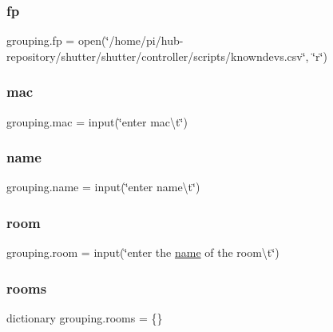 \mbox{\label{namespacegrouping_a1160ca96fae06497787f492dd59fd401}} 
\subsubsection{\texorpdfstring{fp}{fp}}
{\footnotesize\ttfamily grouping.\+fp = open(\char`\"{}/home/pi/hub-\/repository/shutter/shutter/controller/scripts/knowndevs.\+csv\char`\"{}, \char`\"{}r\char`\"{})}

\mbox{\label{namespacegrouping_a64d1c2fe38f97c2f87e5197c25bcdc19}} 
\subsubsection{\texorpdfstring{mac}{mac}}
{\footnotesize\ttfamily grouping.\+mac = input(\char`\"{}enter mac\textbackslash{}t\char`\"{})}

\mbox{\label{namespacegrouping_abb4abfe957716dd9a69fed292a1b0756}} 
\subsubsection{\texorpdfstring{name}{name}}
{\footnotesize\ttfamily grouping.\+name = input(\char`\"{}enter name\textbackslash{}t\char`\"{})}

\mbox{\label{namespacegrouping_ae83727fc9263bcd0288368f3e0fa288b}} 
\subsubsection{\texorpdfstring{room}{room}}
{\footnotesize\ttfamily grouping.\+room = input(\char`\"{}enter the \hyperlink{namespacegrouping_abb4abfe957716dd9a69fed292a1b0756}{name} of the room\textbackslash{}t\char`\"{})}

\mbox{\label{namespacegrouping_add8a745f5adf630b408f7ab91486f52e}} 
\subsubsection{\texorpdfstring{rooms}{rooms}}
{\footnotesize\ttfamily dictionary grouping.\+rooms = \{\}}


